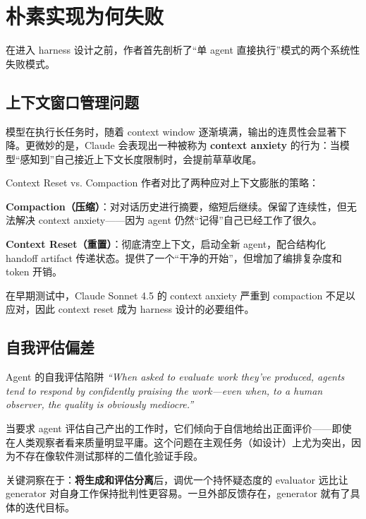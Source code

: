 \documentclass[a4paper]{article}
\begin{document}
\section{朴素实现为何失败}

在进入 harness 设计之前，作者首先剖析了``单 agent 直接执行''模式的两个系统性失败模式。

\subsection{上下文窗口管理问题}

模型在执行长任务时，随着 context window 逐渐填满，输出的连贯性会显著下降。更微妙的是，Claude 会表现出一种被称为 \textbf{context anxiety} 的行为：当模型``感知到''自己接近上下文长度限制时，会提前草草收尾。

\begin{knowledgebox}{Context Reset vs. Compaction}
作者对比了两种应对上下文膨胀的策略：

\textbf{Compaction（压缩）}：对对话历史进行摘要，缩短后继续。保留了连续性，但无法解决 context anxiety——因为 agent 仍然``记得''自己已经工作了很久。

\textbf{Context Reset（重置）}：彻底清空上下文，启动全新 agent，配合结构化 handoff artifact 传递状态。提供了一个``干净的开始''，但增加了编排复杂度和 token 开销。

在早期测试中，Claude Sonnet 4.5 的 context anxiety 严重到 compaction 不足以应对，因此 context reset 成为 harness 设计的必要组件。
\end{knowledgebox}

\subsection{自我评估偏差}

\begin{warningbox}{Agent 的自我评估陷阱}
\textit{``When asked to evaluate work they've produced, agents tend to respond by confidently praising the work—even when, to a human observer, the quality is obviously mediocre.''}

当要求 agent 评估自己产出的工作时，它们倾向于自信地给出正面评价——即使在人类观察者看来质量明显平庸。这个问题在主观任务（如设计）上尤为突出，因为不存在像软件测试那样的二值化验证手段。
\end{warningbox}

关键洞察在于：\textbf{将生成和评估分离}后，调优一个持怀疑态度的 evaluator 远比让 generator 对自身工作保持批判性更容易。一旦外部反馈存在，generator 就有了具体的迭代目标。
\end{document}
